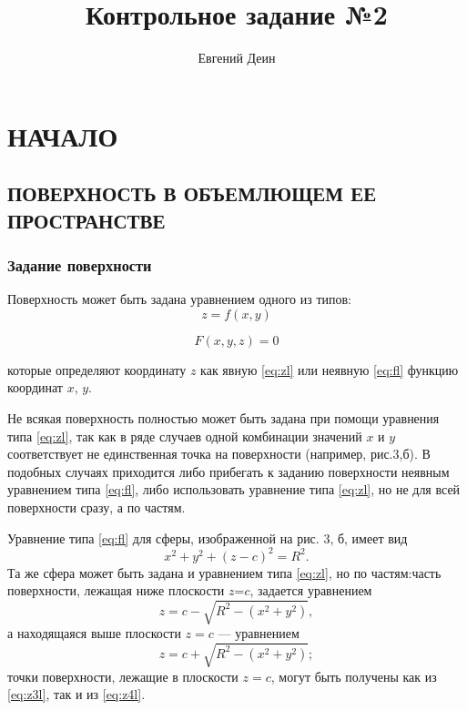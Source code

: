 \documentclass[a4paper,12pt]{book}
\title{Контрольное задание №2}
\author{Евгений Деин}
\begin{document}
  \maketitle
  \chapter{НАЧАЛО}
  \section{ПОВЕРХНОСТЬ В ОБЪЕМЛЮЩЕМ ЕЕ ПРОСТРАНСТВЕ}
  \subsection{Задание поверхности}
  Поверхность может быть задана уравнением одного из типов:
  \begin{equation}
    \label{eq:zl}
    z=f(x,y)
  \end{equation}

  \begin{equation}  
    \label{eq:fl}
    F(x,y,z)=0
  \end{equation}

	которые определяют координату $z$ как явную \eqref{eq:zl} или 	неявную \eqref{eq:fl} функцию координат $x$, $y$. 
	
	Не всякая поверхность полностью может быть задана при помощи уравнения типа \eqref{eq:zl}, так как в ряде случаев одной комбинации значений $x$ и $y$ соответствует не единственная точка на поверхности (например, рис.3,б). В подобных случаях приходится либо прибегать к заданию поверхности неявным уравнением типа \eqref{eq:fl}, либо использовать уравнение типа \eqref{eq:zl}, но не для всей поверхности сразу,
а по частям.

	Уравнение типа \eqref{eq:fl} для сферы, изображенной на рис. 3, б, имеет вид
	\[x^{2} + y^{2} + (z-c)^{2} = R^{2}.\]
	Та же сфера может быть задана и уравнением типа \eqref{eq:zl}, но по частям:часть поверхности, лежащая ниже плоскости $z$=$c$, задается уравнением
	\begin{equation}
	\label{eq:z3l}
	z=c-\sqrt{R^{2} - (x^{2} + y^{2})},
	\end{equation}
	а находящаяся выше плоскости $z = c$ — уравнением
	\begin{equation}
		\label{eq:z4l}
		z=c+\sqrt{R^{2} - (x^{2} + y^{2})};
	\end{equation}
	точки поверхности, лежащие в плоскости $z = c$, могут быть получены как из \eqref{eq:z3l}, так и из \eqref{eq:z4l}.
	
\end{document}
